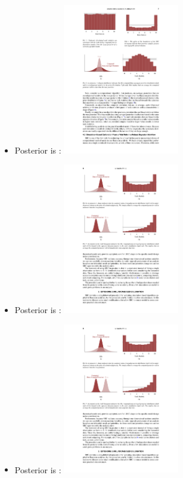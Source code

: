 \documentclass[10pt]{report}
\begin{document}
\begin{itemize}
  \item 
    Posterior is : \hfill
    \includegraphics[valign=c,width=0.4\textwidth]{img/sbc-over.pdf}
  \item 
    Posterior is : \hfill
    \includegraphics[valign=c,width=0.4\textwidth]{img/sbc-under.pdf}
  \item 
    Posterior is : \hfill
    \includegraphics[valign=c,width=0.4\textwidth]{img/sbc-skew.pdf}
\end{itemize}
\end{document}
